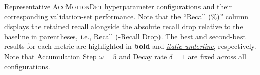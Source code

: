 \begin{table}[hbtp]
    \caption{Representative \textsc{AccMotionDet} hyperparameter configurations
        and their corresponding validation-set performance. Note that the
        ``Recall (\%)'' column displays the retained recall alongside the
        absolute recall drop relative to the baseline in parentheses, i.e.,
        Recall (-Recall Drop). The best and second-best results for each metric
        are highlighted in \textbf{bold} and \textit{\underline{italic
        underline}}, respectively. Note that Accumulation Step $\omega=5$ and
        Decay rate $\delta=1$ are fixed across all configurations. }
    \label{tb:val_results_accMotionDet}
\end{table}
